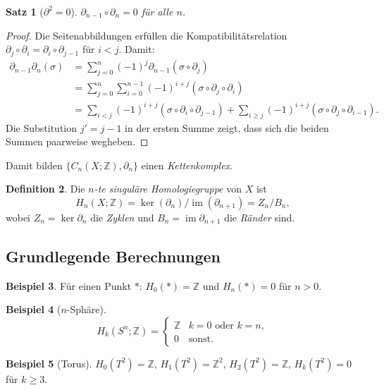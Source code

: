 \documentclass[12pt,a4paper]{amsart}
\newtheorem{theorem}{Satz}[section]
\theoremstyle{definition}
\newtheorem{definition}[theorem]{Definition}
\newtheorem{example}[theorem]{Beispiel}
\begin{document}
\begin{theorem}[$\partial^2 = 0$]
$\partial_{n-1} \circ \partial_n = 0$ f\"ur alle $n$.
\end{theorem}
\begin{proof}
Die Seitenabbildungen erf\"ullen die Kompatibilit\"atsrelation
$\partial_j \circ \partial_i = \partial_i \circ \partial_{j-1}$ f\"ur $i < j$.
Damit:
\begin{align*}
  \partial_{n-1}\partial_n(\sigma)
  &= \sum_{j=0}^n (-1)^j \partial_{n-1}(\sigma \circ \partial_j) \\
  &= \sum_{j=0}^n \sum_{i=0}^{n-1} (-1)^{i+j}
     (\sigma \circ \partial_j \circ \partial_i) \\
  &= \sum_{i < j} (-1)^{i+j}(\sigma \circ \partial_i \circ \partial_{j-1})
   + \sum_{i \geq j} (-1)^{i+j}(\sigma \circ \partial_j \circ \partial_{i-1}).
\end{align*}
Die Substitution $j' = j-1$ in der ersten Summe zeigt, dass sich die beiden
Summen paarweise wegheben.
\end{proof}

Damit bilden $\{C_n(X;\mathbb{Z}), \partial_n\}$ einen \emph{Kettenkomplex}.

\begin{definition}
Die \emph{$n$-te singul\"are Homologiegruppe} von $X$ ist
\[
  H_n(X;\mathbb{Z})
  = \ker(\partial_n) / \operatorname{im}(\partial_{n+1})
  = Z_n / B_n,
\]
wobei $Z_n = \ker \partial_n$ die \emph{Zyklen} und
$B_n = \operatorname{im} \partial_{n+1}$ die \emph{R\"ander} sind.
\end{definition}

\subsection{Grundlegende Berechnungen}

\begin{example}
F\"ur einen Punkt $*$: $H_0(*) = \mathbb{Z}$ und $H_n(*) = 0$ f\"ur $n > 0$.
\end{example}

\begin{example}[$n$-Sph\"are]
\[
  H_k(S^n;\mathbb{Z}) = \begin{cases}
    \mathbb{Z} & k = 0 \text{ oder } k = n, \\
    0 & \text{sonst.}
  \end{cases}
\]
\end{example}

\begin{example}[Torus]
$H_0(T^2) = \mathbb{Z}$, $H_1(T^2) = \mathbb{Z}^2$, $H_2(T^2) = \mathbb{Z}$,
$H_k(T^2) = 0$ f\"ur $k \geq 3$.
\end{example}
\end{document}
